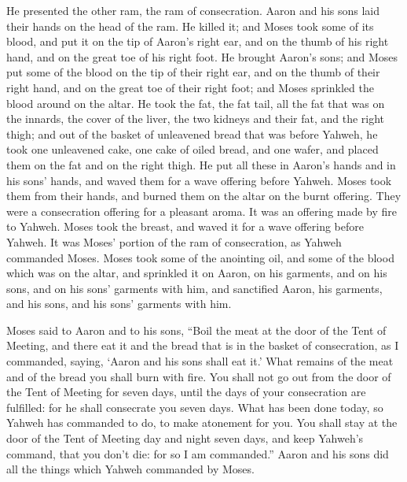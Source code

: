 {He presented the other ram, the ram of consecration. Aaron and his sons laid their hands on the head of the ram.
He killed it; and Moses took some of its blood, and put it on the tip of Aaron’s right ear, and on the thumb of his right hand, and on the great toe of his right foot.
He brought Aaron’s sons; and Moses put some of the blood on the tip of their right ear, and on the thumb of their right hand, and on the great toe of their right foot; and Moses sprinkled the blood around on the altar.
He took the fat, the fat tail, all the fat that was on the innards, the cover of the liver, the two kidneys and their fat, and the right thigh;
and out of the basket of unleavened bread that was before Yahweh, he took one unleavened cake, one cake of oiled bread, and one wafer, and placed them on the fat and on the right thigh.
He put all these in Aaron’s hands and in his sons’ hands, and waved them for a wave offering before Yahweh.
Moses took them from their hands, and burned them on the altar on the burnt offering. They were a consecration offering for a pleasant aroma. It was an offering made by fire to Yahweh.
Moses took the breast, and waved it for a wave offering before Yahweh. It was Moses’ portion of the ram of consecration, as Yahweh commanded Moses.
Moses took some of the anointing oil, and some of the blood which was on the altar, and sprinkled it on Aaron, on his garments, and on his sons, and on his sons’ garments with him, and sanctified Aaron, his garments, and his sons, and his sons’ garments with him.
\par }{\PP {}Moses said to Aaron and to his sons, “Boil the meat at the door of the Tent of Meeting, and there eat it and the bread that is in the basket of consecration, as I commanded, saying, ‘Aaron and his sons shall eat it.’
What remains of the meat and of the bread you shall burn with fire.
You shall not go out from the door of the Tent of Meeting for seven days, until the days of your consecration are fulfilled: for he shall consecrate you seven days.
What has been done today, so Yahweh has commanded to do, to make atonement for you.
You shall stay at the door of the Tent of Meeting day and night seven days, and keep Yahweh’s command, that you don’t die: for so I am commanded.”
Aaron and his sons did all the things which Yahweh commanded by Moses.

}
